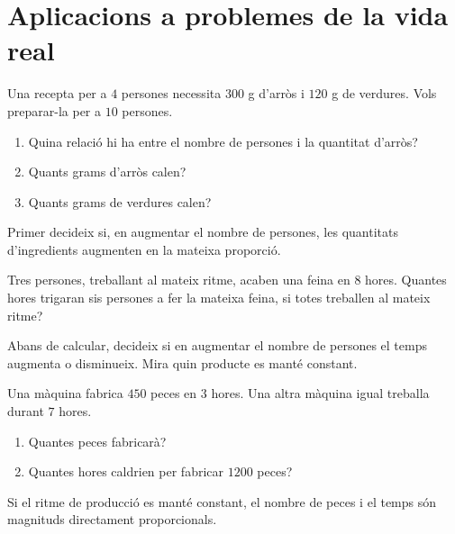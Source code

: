 \section{Aplicacions a problemes de la vida real}

\begin{exercici}[Recepta]
	Una recepta per a \(4\) persones necessita \(300\) g d'arròs i \(120\) g de verdures. Vols preparar-la per a \(10\) persones.
	\begin{enumerate}[label=\alph*)]
		\item Quina relació hi ha entre el nombre de persones i la quantitat d'arròs?
		\item Quants grams d'arròs calen?
		\item Quants grams de verdures calen?
	\end{enumerate}
\end{exercici}

\begin{indicacio}
	Primer decideix si, en augmentar el nombre de persones, les quantitats d'ingredients augmenten en la mateixa proporció.
\end{indicacio}

\begin{exercici}
	Tres persones, treballant al mateix ritme, acaben una feina en \(8\) hores. Quantes hores trigaran sis persones a fer la mateixa feina, si totes treballen al mateix ritme?
\end{exercici}

\begin{indicacio}
	Abans de calcular, decideix si en augmentar el nombre de persones el temps augmenta o disminueix. Mira quin producte es manté constant.
\end{indicacio}

\begin{exercici}[Producció]
	Una màquina fabrica \(450\) peces en \(3\) hores. Una altra màquina igual treballa durant \(7\) hores.
	\begin{enumerate}[label=\alph*)]
		\item Quantes peces fabricarà?
		\item Quantes hores caldrien per fabricar \(1200\) peces?
	\end{enumerate}
\end{exercici}

\begin{indicacio}
	Si el ritme de producció es manté constant, el nombre de peces i el temps són magnituds directament proporcionals.
\end{indicacio}

